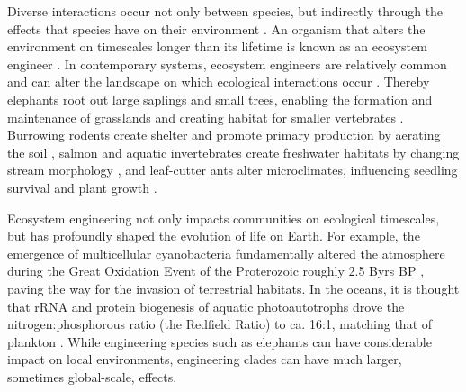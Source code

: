 \documentclass[9pt,twocolumn,twoside]{pnas-new}
\begin{document}


Diverse interactions occur not only between species, but indirectly through the effects that species have on their environment \cite{Jones1994,Olff2009,OdlingSmee2013}.
An organism that alters the environment on timescales longer than its lifetime is known as an ecosystem engineer \cite{Hastings2007}.
In contemporary systems, ecosystem engineers are relatively common and can alter the landscape on which ecological interactions occur \cite{Wright2006}.
Thereby elephants root out large saplings and small trees, enabling the formation and maintenance of grasslands \cite{Haynes2012} and creating habitat for smaller vertebrates \cite{Pringle2008}.
Burrowing rodents create shelter and promote primary production by aerating the soil \cite{Reichman2002}, salmon and aquatic invertebrates create freshwater habitats by changing stream morphology \cite{Moore2006}, and leaf-cutter ants alter microclimates, influencing seedling survival and plant growth \cite{Meyer2011}.

Ecosystem engineering not only impacts communities on ecological timescales, but has profoundly shaped the evolution of life on Earth.
For example, the emergence of multicellular cyanobacteria fundamentally altered the atmosphere during the Great Oxidation Event of the Proterozoic roughly 2.5 Byrs BP \cite{Schirrmeister2013}, paving the way for the invasion of terrestrial habitats.
In the oceans, it is thought that rRNA and protein biogenesis of aquatic photoautotrophs drove the nitrogen:phosphorous ratio (the Redfield Ratio) to ca. 16:1, matching that of plankton \cite{Loladze2011}.
While engineering species such as elephants can have considerable impact on local environments, engineering clades can have much larger, sometimes global-scale, effects.
\end{document}
